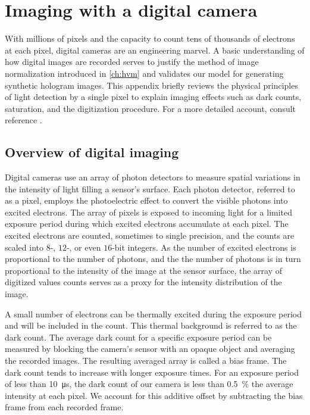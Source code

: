 \SkipTocEntry\chapter{Imaging with a digital camera} 
\label{app:digital_imaging}

With millions of pixels and the capacity to count tens of thousands of electrons
at each pixel, digital cameras are an engineering marvel. 
A basic understanding of how digital images are recorded serves to justify the
method of image normalization introduced in \autoref{ch:hvm}
and validates our model for generating synthetic
hologram images. This appendix briefly reviews the physical
principles of light detection by a single pixel to explain imaging effects such as
dark counts, saturation, and the digitization procedure. For a more detailed account,
consult reference \cite{nakamura2017}.

\section{Overview of digital imaging}

Digital cameras use an array of photon detectors to measure spatial variations in the
intensity of light filling a sensor's surface. Each photon detector, referred to as a pixel,
employs the photoelectric effect to convert the visible photons into
excited electrons.
The array of pixels is exposed to incoming light for a limited
exposure period during which excited electrons accumulate at each pixel.
The excited electrons are counted, sometimes to single precision,
and the counts are scaled into $8$-, $12$-, or even $16$-bit integers. As the number of
excited electrons is proportional to the number of photons, and the the number of
photons is in turn proportional to the intensity of the image at the
sensor surface, the array of digitized values counts serves as a proxy for
the intensity distribution of the image.

A small number of electrons can be thermally excited during the exposure period and
will be included in the count. This thermal background is referred to
as the dark count. The average dark count for a specific exposure period can be measured
by blocking the camera's sensor with an opaque object and averaging the
recorded images. The resulting averaged array is called a bias frame.
The dark count tends to increase with longer exposure times.
For an exposure period of less than \SI{10}{\us}, the dark
count of our camera is less than \SI{0.5}{\percent} the average intensity
at each pixel. We account for this additive offset by subtracting the bias
frame from each recorded frame.

